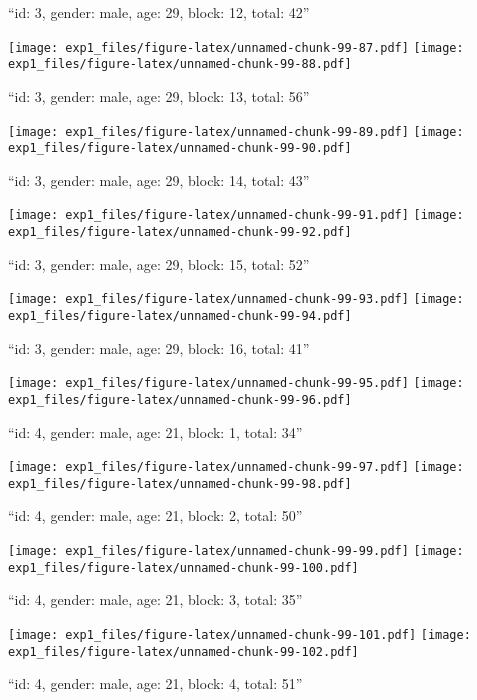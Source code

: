 \documentclass[,]{article}
\begin{document}
``id: 3, gender: male, age: 29, block: 12, total: 42''

\texttt{[image: exp1\_files/figure-latex/unnamed-chunk-99-87.pdf]}
\texttt{[image: exp1\_files/figure-latex/unnamed-chunk-99-88.pdf]}

\newpage
[1] 

``id: 3, gender: male, age: 29, block: 13, total: 56''

\texttt{[image: exp1\_files/figure-latex/unnamed-chunk-99-89.pdf]}
\texttt{[image: exp1\_files/figure-latex/unnamed-chunk-99-90.pdf]}

\newpage
[1] 

``id: 3, gender: male, age: 29, block: 14, total: 43''

\texttt{[image: exp1\_files/figure-latex/unnamed-chunk-99-91.pdf]}
\texttt{[image: exp1\_files/figure-latex/unnamed-chunk-99-92.pdf]}

\newpage
[1] 

``id: 3, gender: male, age: 29, block: 15, total: 52''

\texttt{[image: exp1\_files/figure-latex/unnamed-chunk-99-93.pdf]}
\texttt{[image: exp1\_files/figure-latex/unnamed-chunk-99-94.pdf]}

\newpage
[1] 

``id: 3, gender: male, age: 29, block: 16, total: 41''

\texttt{[image: exp1\_files/figure-latex/unnamed-chunk-99-95.pdf]}
\texttt{[image: exp1\_files/figure-latex/unnamed-chunk-99-96.pdf]}

\newpage
[1] 

``id: 4, gender: male, age: 21, block: 1, total: 34''

\texttt{[image: exp1\_files/figure-latex/unnamed-chunk-99-97.pdf]}
\texttt{[image: exp1\_files/figure-latex/unnamed-chunk-99-98.pdf]}

\newpage
[1] 

``id: 4, gender: male, age: 21, block: 2, total: 50''

\texttt{[image: exp1\_files/figure-latex/unnamed-chunk-99-99.pdf]}
\texttt{[image: exp1\_files/figure-latex/unnamed-chunk-99-100.pdf]}

\newpage
[1] 

``id: 4, gender: male, age: 21, block: 3, total: 35''

\texttt{[image: exp1\_files/figure-latex/unnamed-chunk-99-101.pdf]}
\texttt{[image: exp1\_files/figure-latex/unnamed-chunk-99-102.pdf]}

\newpage
[1] 

``id: 4, gender: male, age: 21, block: 4, total: 51''
\end{document}
